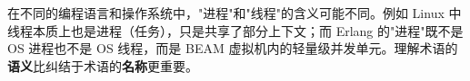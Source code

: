\begin{warnbox}[术语陷阱]
在不同的编程语言和操作系统中，"进程"和"线程"的含义可能不同。例如 Linux 中线程本质上也是进程（任务），只是共享了部分上下文；而 Erlang 的"进程"既不是 OS 进程也不是 OS 线程，而是 BEAM 虚拟机内的轻量级并发单元。理解术语的\textbf{语义}比纠结于术语的\textbf{名称}更重要。
\end{warnbox}
